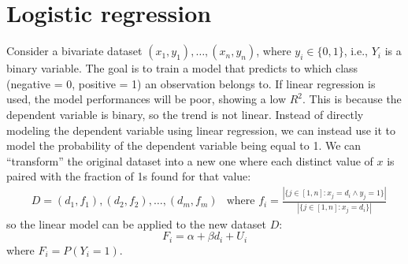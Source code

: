 \section{Logistic regression}

Consider a bivariate dataset $(x_1, y_1), \ldots, (x_n, y_n)$, where $y_i \in \{0,1\}$, i.e., $Y_i$ is a binary variable. The goal is to train a model that predicts to which class (negative = 0, positive = 1) an observation belongs to. If linear regression is used, the model performances will be poor, showing a low $R^2$. This is because the dependent variable is binary, so the trend is not linear. Instead of directly modeling the dependent variable using linear regression, we can instead use it to model the probability of the dependent variable being equal to 1. We can ``transform'' the original dataset into a new one where each distinct value of $x$ is paired with the fraction of 1s found for that value:
\begin{align*}
    &D = (d_1, f_1), (d_2, f_2), \ldots, (d_m, f_m) &\text{where } f_i = \frac{|\{j \in [1,n] : x_j = d_i \land y_j = 1\}|}{|\{j \in [1,n] : x_j = d_i\}|}
\end{align*}
so the linear model can be applied to the new dataset $D$:
\begin{equation*}
    F_i = \alpha + \beta d_i + U_i
\end{equation*}
where $F_i = P(Y_i = 1)$.

